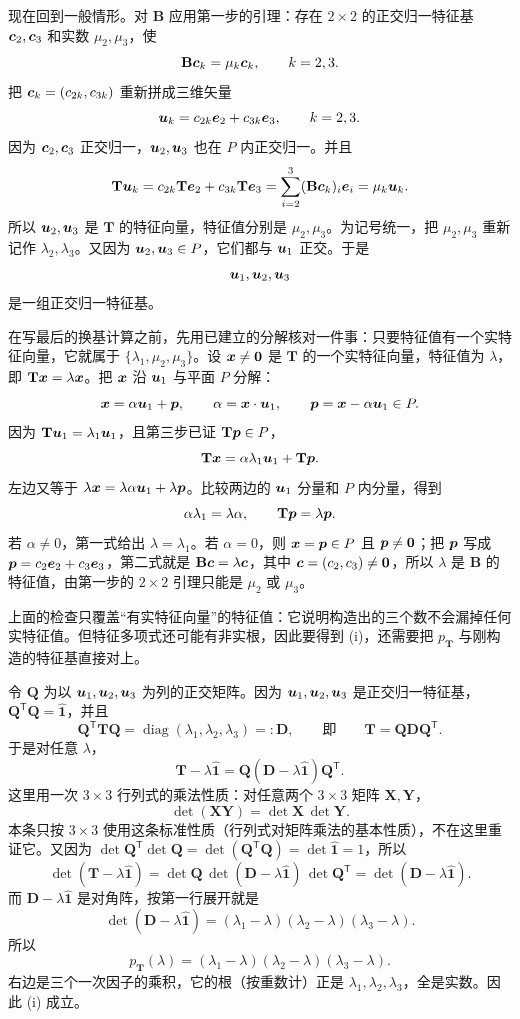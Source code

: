 \documentclass[11pt]{ctexart}
\newcommand{\ten}[1]{\mathbf{#1}}
\newcommand{\unitd}{\hat{\ten{1}}}
\begin{document}
现在回到一般情形。对 $\ten B$ 应用第一步的引理：存在 $2\times2$ 的正交归一特征基 $\boldsymbol{c}_2,\boldsymbol{c}_3$ 和实数 $\mu_2,\mu_3$，使
\[
\ten B\vect c_k=\mu_k\vect c_k,\qquad k=2,3 .
\]
把 $\boldsymbol{c}_k=(c_{2k},c_{3k})$ 重新拼成三维矢量
\[
\boldsymbol{u}_k=c_{2k}\boldsymbol{e}_2+c_{3k}\boldsymbol{e}_3,\qquad k=2,3 .
\]
因为 $\boldsymbol{c}_2,\boldsymbol{c}_3$ 正交归一，$\boldsymbol{u}_2,\boldsymbol{u}_3$ 也在 $P$ 内正交归一。并且
\[
\ten T\vect u_k
=c_{2k}\ten T\vect e_2+c_{3k}\ten T\vect e_3
=\sum_{i=2}^{3}(\ten B\vect c_k)_i\vect e_i
=\mu_k\vect u_k .
\]
所以 $\boldsymbol{u}_2,\boldsymbol{u}_3$ 是 $\ten T$ 的特征向量，特征值分别是 $\mu_2,\mu_3$。为记号统一，把 $\mu_2,\mu_3$ 重新记作 $\lambda_2,\lambda_3$。又因为 $\boldsymbol{u}_2,\boldsymbol{u}_3\in P$，它们都与 $\boldsymbol{u}_1$ 正交。于是
\[
\boldsymbol{u}_1,\boldsymbol{u}_2,\boldsymbol{u}_3
\]
是一组正交归一特征基。

在写最后的换基计算之前，先用已建立的分解核对一件事：只要特征值有一个实特征向量，它就属于 $\{\lambda_1,\mu_2,\mu_3\}$。设 $\boldsymbol{x}\ne\boldsymbol{0}$ 是 $\ten T$ 的一个实特征向量，特征值为 $\lambda$，即 $\ten T\vect x=\lambda\vect x$。把 $\boldsymbol{x}$ 沿 $\boldsymbol{u}_1$ 与平面 $P$ 分解：
\[
\boldsymbol{x}=\alpha\boldsymbol{u}_1+\boldsymbol{p},\qquad
\alpha=\boldsymbol{x}\cdot\boldsymbol{u}_1,\qquad
\boldsymbol{p}=\boldsymbol{x}-\alpha\boldsymbol{u}_1\in P .
\]
因为 $\ten T\vect u_1=\lambda_1\vect u_1$，且第三步已证 $\ten T\vect p\in P$，
\[
\ten T\vect x=\alpha\lambda_1\vect u_1+\ten T\vect p .
\]
左边又等于 $\lambda\boldsymbol{x}=\lambda\alpha\boldsymbol{u}_1+\lambda\boldsymbol{p}$。比较两边的 $\boldsymbol{u}_1$ 分量和 $P$ 内分量，得到
\[
\alpha\lambda_1=\lambda\alpha,\qquad
\ten T\vect p=\lambda\vect p .
\]
若 $\alpha\ne0$，第一式给出 $\lambda=\lambda_1$。若 $\alpha=0$，则 $\boldsymbol{x}=\boldsymbol{p}\in P$ 且 $\boldsymbol{p}\ne\boldsymbol{0}$；把 $\boldsymbol{p}$ 写成 $\boldsymbol{p}=c_2\boldsymbol{e}_2+c_3\boldsymbol{e}_3$，第二式就是 $\ten B\vect c=\lambda\vect c$，其中 $\boldsymbol{c}=(c_2,c_3)\ne\boldsymbol{0}$，所以 $\lambda$ 是 $\ten B$ 的特征值，由第一步的 $2\times2$ 引理只能是 $\mu_2$ 或 $\mu_3$。

上面的检查只覆盖“有实特征向量”的特征值：它说明构造出的三个数不会漏掉任何实特征值。但特征多项式还可能有非实根，因此要得到 (i)，还需要把 $p_{\ten T}$ 与刚构造的特征基直接对上。

令 $\ten Q$ 为以 $\boldsymbol{u}_1,\boldsymbol{u}_2,\boldsymbol{u}_3$ 为列的正交矩阵。因为 $\boldsymbol{u}_1,\boldsymbol{u}_2,\boldsymbol{u}_3$ 是正交归一特征基，$\ten Q^{\mathsf T}\ten Q=\unitd$，并且
\[
\ten Q^{\mathsf T}\ten T\ten Q
=\operatorname{diag}(\lambda_1,\lambda_2,\lambda_3)=:\ten D,
\qquad\text{即}\qquad
\ten T=\ten Q\ten D\ten Q^{\mathsf T}.
\]
于是对任意 $\lambda$，
\[
\ten T-\lambda\unitd=\ten Q(\ten D-\lambda\unitd)\ten Q^{\mathsf T}.
\]
这里用一次 $3\times3$ 行列式的乘法性质：对任意两个 $3\times3$ 矩阵 $\ten X,\ten Y$，
\[
\det(\ten X\ten Y)=\det\ten X\,\det\ten Y .
\]
本条只按 $3\times3$ 使用这条标准性质（行列式对矩阵乘法的基本性质），不在这里重证它。又因为 $\det\ten Q^{\mathsf T}\det\ten Q=\det(\ten Q^{\mathsf T}\ten Q)=\det\unitd=1$，所以
\[
\det(\ten T-\lambda\unitd)
=\det\ten Q\,\det(\ten D-\lambda\unitd)\,\det\ten Q^{\mathsf T}
=\det(\ten D-\lambda\unitd).
\]
而 $\ten D-\lambda\unitd$ 是对角阵，按第一行展开就是
\[
\det(\ten D-\lambda\unitd)
=(\lambda_1-\lambda)(\lambda_2-\lambda)(\lambda_3-\lambda).
\]
所以
\[
p_{\ten T}(\lambda)=(\lambda_1-\lambda)(\lambda_2-\lambda)(\lambda_3-\lambda).
\]
右边是三个一次因子的乘积，它的根（按重数计）正是 $\lambda_1,\lambda_2,\lambda_3$，全是实数。因此 (i) 成立。
\end{document}
